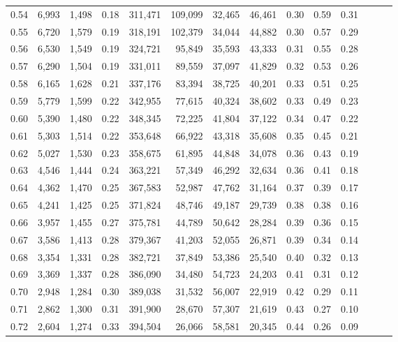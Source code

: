\begin{tabular}{rrrrrrrrrrrrrr}
0.54 &  6,993 &  1,498 &  0.18 &  311,471 &  109,099 &  32,465 &  46,461 &  0.30 &  0.59 &      0.31 \\
0.55 &  6,720 &  1,579 &  0.19 &  318,191 &  102,379 &  34,044 &  44,882 &  0.30 &  0.57 &      0.29 \\
0.56 &  6,530 &  1,549 &  0.19 &  324,721 &   95,849 &  35,593 &  43,333 &  0.31 &  0.55 &      0.28 \\
0.57 &  6,290 &  1,504 &  0.19 &  331,011 &   89,559 &  37,097 &  41,829 &  0.32 &  0.53 &      0.26 \\
0.58 &  6,165 &  1,628 &  0.21 &  337,176 &   83,394 &  38,725 &  40,201 &  0.33 &  0.51 &      0.25 \\
0.59 &  5,779 &  1,599 &  0.22 &  342,955 &   77,615 &  40,324 &  38,602 &  0.33 &  0.49 &      0.23 \\
0.60 &  5,390 &  1,480 &  0.22 &  348,345 &   72,225 &  41,804 &  37,122 &  0.34 &  0.47 &      0.22 \\
0.61 &  5,303 &  1,514 &  0.22 &  353,648 &   66,922 &  43,318 &  35,608 &  0.35 &  0.45 &      0.21 \\
0.62 &  5,027 &  1,530 &  0.23 &  358,675 &   61,895 &  44,848 &  34,078 &  0.36 &  0.43 &      0.19 \\
0.63 &  4,546 &  1,444 &  0.24 &  363,221 &   57,349 &  46,292 &  32,634 &  0.36 &  0.41 &      0.18 \\
0.64 &  4,362 &  1,470 &  0.25 &  367,583 &   52,987 &  47,762 &  31,164 &  0.37 &  0.39 &      0.17 \\
0.65 &  4,241 &  1,425 &  0.25 &  371,824 &   48,746 &  49,187 &  29,739 &  0.38 &  0.38 &      0.16 \\
0.66 &  3,957 &  1,455 &  0.27 &  375,781 &   44,789 &  50,642 &  28,284 &  0.39 &  0.36 &      0.15 \\
0.67 &  3,586 &  1,413 &  0.28 &  379,367 &   41,203 &  52,055 &  26,871 &  0.39 &  0.34 &      0.14 \\
0.68 &  3,354 &  1,331 &  0.28 &  382,721 &   37,849 &  53,386 &  25,540 &  0.40 &  0.32 &      0.13 \\
0.69 &  3,369 &  1,337 &  0.28 &  386,090 &   34,480 &  54,723 &  24,203 &  0.41 &  0.31 &      0.12 \\
0.70 &  2,948 &  1,284 &  0.30 &  389,038 &   31,532 &  56,007 &  22,919 &  0.42 &  0.29 &      0.11 \\
0.71 &  2,862 &  1,300 &  0.31 &  391,900 &   28,670 &  57,307 &  21,619 &  0.43 &  0.27 &      0.10 \\
0.72 &  2,604 &  1,274 &  0.33 &  394,504 &   26,066 &  58,581 &  20,345 &  0.44 &  0.26 &      0.09 \\

\end{tabular}
